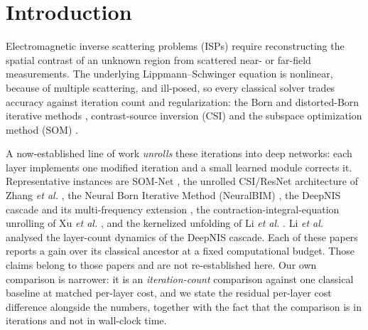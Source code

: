 \documentclass[journal,cmes,article,submit,moreauthors,pdftex]{Definitions/tsp}
\begin{document}
\section{Introduction}
Electromagnetic inverse scattering problems (ISPs) require reconstructing the spatial contrast of
an unknown region from scattered near- or far-field measurements. The underlying
Lippmann--Schwinger equation is nonlinear, because of multiple scattering, and ill-posed, so every
classical solver trades accuracy against iteration count and regularization: the Born and
distorted-Born iterative methods \cite{born_lit}, contrast-source inversion (CSI) \cite{csi_lit}
and the subspace optimization method (SOM) \cite{som_lit}.

A now-established line of work \emph{unrolls} these iterations into deep networks: each layer
implements one modified iteration and a small learned module corrects it. Representative
instances are SOM-Net \cite{somnet}, the unrolled CSI/ResNet architecture of Zhang \emph{et al.}
\cite{unrolledcnn}, the Neural Born Iterative Method (NeuralBIM) \cite{neuralbim}, the DeepNIS
cascade \cite{deepnis} and its multi-frequency extension \cite{mfneuralbim}, the
contraction-integral-equation unrolling of Xu \emph{et al.} \cite{ciesomnet}, and the kernelized
unfolding of Li \emph{et al.} \cite{kernelunroll}. Li \emph{et al.} \cite{li2019cnn} analysed the
layer-count dynamics of the DeepNIS cascade. Each of these papers reports a gain over its
classical ancestor at a fixed computational budget. Those claims belong to those papers and are
not re-established here. Our own comparison is narrower: it is an \emph{iteration-count} comparison against one classical baseline at
matched per-layer cost, and we state the residual per-layer cost difference alongside the numbers,
together with the fact that the comparison is in iterations and not in wall-clock time.
\end{document}
